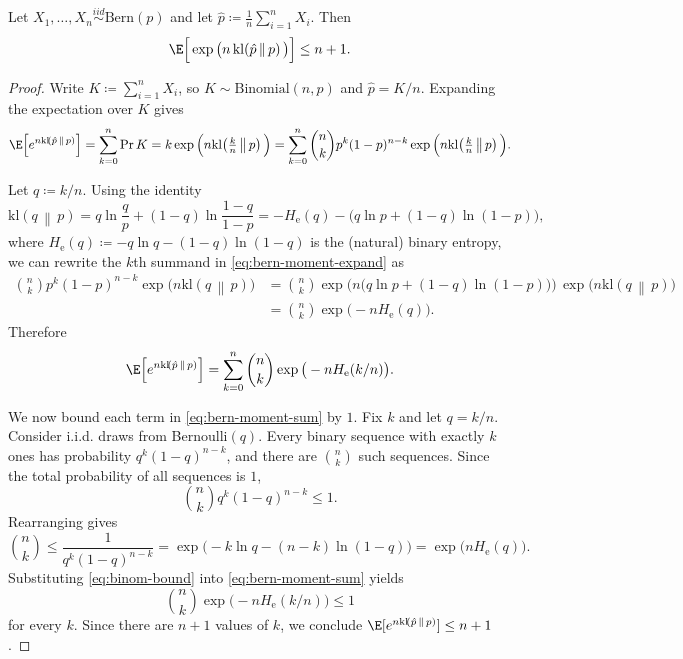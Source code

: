 \documentclass{article}
\numberwithin{equation}{section}
\newcommand{\Bern}{{\mbox{Bern}}}
\newcommand{\kl}[2]{\mathrm{kl}\!\left(#1\,\middle\|\,#2\right)}
\newcommand{\iid}{\stackrel{iid}{\sim}}
\begin{document}
\begin{lemma}
\label{lem:bern-moment}
Let $X_1,\dots,X_n\iid\Bern(p)$ and let $\hat p\coloneqq \frac1n\sum_{i=1}^n X_i$.
Then
\begin{equation}
\label{eq:bern-moment}
    \E\Big[\exp\big(n\,\kl{\hat p}{p}\big)\Big] \le n+1.
\end{equation}
\end{lemma}
\begin{proof}
Write $K\coloneqq \sum_{i=1}^n X_i$, so $K\sim\mathrm{Binomial}(n,p)$ and $\hat p=K/n$.
Expanding the expectation over $K$ gives
\begin{equation}
\label{eq:bern-moment-expand}
\E\Big[e^{n\kl{\hat p}{p}}\Big]
= \sum_{k=0}^n \Pr{K=k}\exp\Big(n\kl{\tfrac{k}{n}}{p}\Big)
= \sum_{k=0}^n \binom{n}{k} p^k(1-p)^{n-k}\exp\Big(n\kl{\tfrac{k}{n}}{p}\Big).
\end{equation}

Let $q\coloneqq k/n$.
Using the identity
\begin{equation}
    \kl{q}{p}
    = q\ln\frac{q}{p} + (1-q)\ln\frac{1-q}{1-p}
    = -H_{\mathrm{e}}(q) - \big(q\ln p + (1-q)\ln(1-p)\big),
\end{equation}
where $H_{\mathrm{e}}(q)\coloneqq -q\ln q-(1-q)\ln(1-q)$ is the (natural) binary entropy,
we can rewrite the $k$th summand in \eqref{eq:bern-moment-expand} as
\begin{align}
    \binom{n}{k} p^k(1-p)^{n-k}\exp\big(n\kl{q}{p}\big)
    &= \binom{n}{k}\exp\Big(n\big(q\ln p+(1-q)\ln(1-p)\big)\Big)\,\exp\big(n\kl{q}{p}\big)\\
    &= \binom{n}{k}\exp\big(-n H_{\mathrm{e}}(q)\big).
\end{align}
Therefore
\begin{equation}
\label{eq:bern-moment-sum}
    \E\Big[e^{n\kl{\hat p}{p}}\Big]
    = \sum_{k=0}^n \binom{n}{k}\exp\big(-n H_{\mathrm{e}}(k/n)\big).
\end{equation}

We now bound each term in \eqref{eq:bern-moment-sum} by $1$.
Fix $k$ and let $q=k/n$.
Consider i.i.d. draws from Bernoulli$(q)$.
Every binary sequence with exactly $k$ ones has probability $q^k(1-q)^{n-k}$, and there are $\binom{n}{k}$ such sequences.
Since the total probability of all sequences is $1$,
\begin{equation}
    \binom{n}{k} q^k(1-q)^{n-k} \le 1.
\end{equation}
Rearranging gives
\begin{equation}
\label{eq:binom-bound}
    \binom{n}{k}
    \le \frac{1}{q^k(1-q)^{n-k}}
    = \exp\Big(-k\ln q - (n-k)\ln(1-q)\Big)
    = \exp\big(n H_{\mathrm{e}}(q)\big).
\end{equation}
Substituting \eqref{eq:binom-bound} into \eqref{eq:bern-moment-sum} yields
\begin{equation}
    \binom{n}{k}\exp\big(-n H_{\mathrm{e}}(k/n)\big) \le 1
\end{equation}
for every $k$.
Since there are $n+1$ values of $k$, we conclude
\(\E[e^{n\kl{\hat p}{p}}]\le n+1\).
\end{proof}
\end{document}
